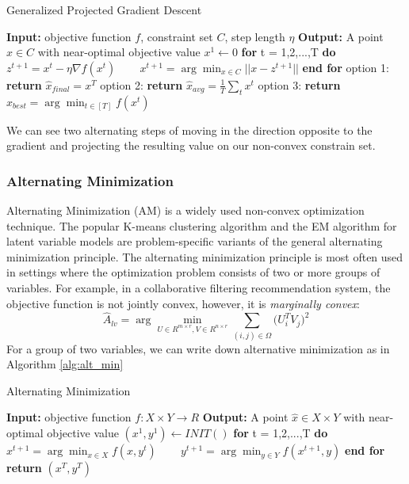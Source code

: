 \begin{algorithm}
\caption{Generalized Projected Gradient Descent}
\label{alg:general_pgd}
\begin{algorithmic}[1]
\STATE \textbf{Input:} objective function $f$, constraint set $C$, step length $\eta$
\STATE \textbf{Output:} A point $\hat{x} \in C$ with near-optimal objective value
\STATE $x^{1} \leftarrow 0$
\STATE \textbf{for} t = 1,2,...,T \textbf{do}
\STATE ~~~ $z^{t+1} = x^{t} - \eta \nabla f(x^{t})$
\STATE ~~~ $x^{t+1} = \arg \min_{x \in C}||x - z^{t+1}||$
\STATE \textbf{end for}
\STATE option 1: \textbf{return} $\hat{x}_{final} = x^{T}$
\STATE option 2: \textbf{return} $\hat{x}_{avg} = \frac{1}{T}\sum_t x^{t}$
\STATE option 3: \textbf{return} $\hat{x}_{best} = \arg \min_{t \in [T]} f(x^{t})$
\end{algorithmic}
\end{algorithm}
We can see two alternating steps of moving in the direction opposite to the gradient and projecting the resulting value on our non-convex constrain set. 

\subsubsection{Alternating Minimization}

Alternating Minimization (AM) is a widely used non-convex optimization technique. The popular K-means clustering algorithm and the EM algorithm for latent variable models are problem-specific variants of the general alternating minimization principle. The alternating minimization principle is most often used in settings where the optimization problem consists of two or more groups of variables. For example, in a collaborative filtering recommendation system, the objective function is not jointly convex, however, it is \textit{marginally convex}:
\begin{equation}
    \hat{A}_{lv} = \arg \min_{U \in R^{m\times r}, V \in R^{n\times r}} \sum_{(i,j)\in \Omega}\big(U_{i}^{T}V_{j}\big)^{2}
\end{equation}
For a group of two variables, we can write down alternative minimization as in Algorithm \ref{alg:alt_min}
\begin{algorithm}
\caption{Alternating Minimization}
\label{alg:alt_min}
\begin{algorithmic}[1]
\STATE \textbf{Input:} objective function $f: X \times Y \rightarrow R$
\STATE \textbf{Output:} A point $\hat{x} \in X \times Y$ with near-optimal objective value
\STATE $(x^{1}, y^{1}) \leftarrow INIT()$
\STATE \textbf{for} t = 1,2,...,T \textbf{do}
\STATE ~~~ $x^{t+1} = \arg \min_{x \in X} f(x, y^t)$
\STATE ~~~ $y^{t+1} = \arg \min_{y \in Y} f(x^{t+1}, y)$
\STATE \textbf{end for}
\STATE \textbf{return} $(x^{T}, y^{T})$
\end{algorithmic}
\end{algorithm}

